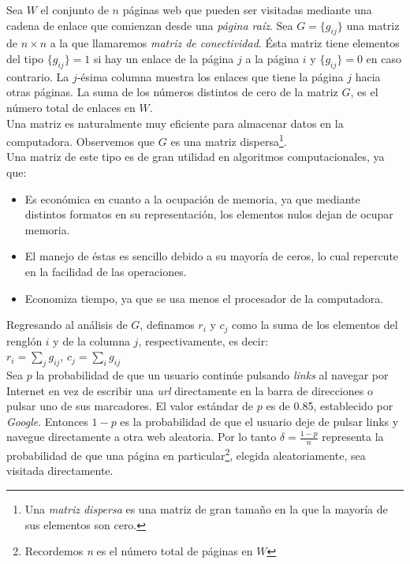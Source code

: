 \documentclass[letterpaper,11pt]{article}
\begin{document}
Sea $W$ el conjunto de $n$ páginas web que pueden ser visitadas mediante una cadena de enlace que comienzan desde una \textit{página raíz}. Sea $G=\{ g_{ij}\}$ una matriz de $n\times n$ a la que llamaremos \textit{matriz de conectividad}. Ésta matriz tiene elementos del tipo $\{ g_{ij}\}=1$ si hay un enlace de la página $j$ a la página $i$ y $\{ g_{ij}\}=0$ en caso contrario. La $j$-ésima columna muestra los enlaces que tiene la página $j$ hacia otras páginas. La suma de los números distintos de cero de la matriz $G$, es el número total de enlaces en $W$.\\
\newpage
Una matriz es naturalmente muy eficiente para almacenar datos en la computadora. Observemos que $G$ es una matriz dispersa\footnote{Una \emph{matriz dispersa} es una matriz de gran tamaño en la que la mayoría de sus elementos son cero.}. \\

Una matriz de este tipo es de gran utilidad en algoritmos computacionales, ya que:
\begin{itemize}
\item Es económica en cuanto a la ocupación de memoria, ya que mediante distintos formatos en su representación, los elementos nulos dejan de ocupar memoria.
\item El manejo de éstas es sencillo debido a su mayoría de ceros, lo cual repercute en la facilidad de las operaciones.
\item Economiza tiempo, ya que se usa menos el procesador de la computadora.
\end{itemize} 


Regresando al análisis de $G$, definamos $r_i$ y $c_j$ como la suma de los elementos del renglón $i$ y de la columna $j$, respectivamente, es decir:\\


$r_i = \displaystyle \sum _j g_{ij}$, $c_j = \displaystyle \sum _i g_{ij}$\\

Sea $p$ la probabilidad de que un usuario continúe pulsando \textit{links} al navegar por Internet en vez de escribir una \textit{url} directamente en la barra de direcciones o pulsar uno de sus marcadores. El valor estándar de $p$ es de 0.85, establecido por \textit{Google}. Entonces $1-p$ es la probabilidad de que el usuario deje de pulsar links y navegue directamente a otra web aleatoria. Por lo tanto $\delta = \displaystyle \frac{1-p}{n} $ representa la probabilidad de que una página en particular\footnote{Recordemos \emph{n} es el número total de páginas en $W$}, elegida aleatoriamente, sea visitada directamente.\\
\end{document}

